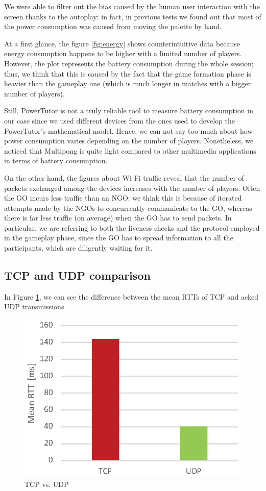 
We were able to filter out the bias caused by the human user interaction with
the screen thanks to the autoplay: in fact, in previous tests we found out
that most of the power consumption was caused from moving the palette by hand.

At a first glance, the figure \ref{fig:energy} shows counterintuitive data
because energy consumption happens to be higher with a limited number of
players. However, the plot represents the  battery consumption
during the whole session; thus, we think that this is caused by the fact that
the game formation phase is heavier than the gameplay one (which is much longer
in matches with a bigger number of players).

Still, PowerTutor is not a truly reliable tool to measure battery consumption in
our case since we used different devices from the ones used to develop the
PowerTutor's mathematical model. Hence, we can not say too much about how power
consumption varies depending on the number of players. Nonetheless, we noticed
that Multipong is quite light compared to other multimedia applications in
terms of battery consumption.


On the other hand, the figures about Wi-Fi traffic reveal that the number of
packets exchanged among the devices increases with the number of players. Often
the GO incurs less traffic than an NGO: we think this is because of iterated
attempts made by the NGOs to concurrently communicate to the GO, whereas
there is far less traffic (on average) when the GO has to send packets. In
particular, we are referring to both the liveness checks and the protocol
employed in the gameplay phase, since the GO has to spread information to all
the participants, which are diligently waiting for it.

\subsection{TCP and UDP comparison}

In Figure \ref{fig:TCP-UDP}, we can see the difference between the mean RTTs of
TCP and acked UDP transmissions.

\begin{figure}[H]
  \centering
  \includegraphics[width=.8\columnwidth]{img/UDPvsTCP-RTT.eps}
  \caption{TCP vs. UDP}
  \label{fig:TCP-UDP}
\end{figure}

